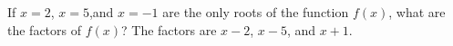 {If $x=2$, $x=5$,and $x=-1$ are the only roots of the function $f(x)$, what are the factors of $f(x)$?}
{The factors are $x-2$, $x-5$, and $x+1$.}
